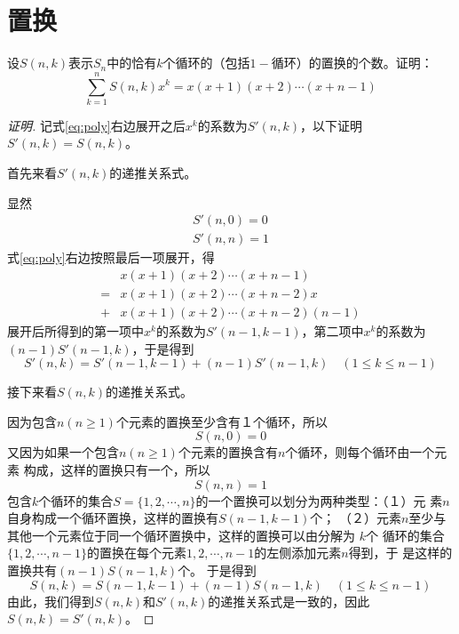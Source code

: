 \chapter{置换}
\begin{Ex}
  设$S(n,k)$表示$S_n$中的恰有$k$个循环的（包括$1-$循环）的置换的个数。证明：
  \begin{equation}
    \label{eq:poly}
    \sum_{k=1}^nS(n,k)x^k = x(x+1)(x+2)\cdots(x+n-1)
  \end{equation}
\end{Ex}
\begin{proof}[证明]
  记式\eqref{eq:poly}右边展开之后$x^k$的系数为$S'(n,k)$，以下证明
  $S'(n,k)=S(n,k)$。

  首先来看$S'(n,k)$的递推关系式。
  
  显然
  \begin{equation}
    \begin{split}
      S'(n,0) = 0\\
      S'(n,n) = 1
    \end{split}
  \end{equation}
  式\eqref{eq:poly}右边按照最后一项展开，得
  \begin{equation}
    \begin{split}
    &x(x+1)(x+2)\cdots(x+n-1)\\
    =&x(x+1)(x+2)\cdots(x+n-2)x\\
    +&x(x+1)(x+2)\cdots(x+n-2)(n-1)
    \end{split}
  \end{equation}
  展开后所得到的第一项中$x^k$的系数为$S'(n-1,k-1)$，第二项中$x^k$的系数为
  $(n-1)S'(n-1,k)$，于是得到
  \begin{equation}
    S'(n,k) = S'(n-1,k-1) + (n-1)S'(n-1,k) \quad (1 \leq k \leq n-1)
  \end{equation}

  接下来看$S(n,k)$的递推关系式。
  
  因为包含$n(n\geq 1)$个元素的置换至少含有１个循环，所以
  \begin{equation}
    S(n,0)=0
  \end{equation}
  又因为如果一个包含$n(n\geq 1)$个元素的置换含有$n$个循环，则每个循环由一个元素
  构成，这样的置换只有一个，所以
  \begin{equation}
    S(n,n)=1
  \end{equation}
  包含$k$个循环的集合$S=\{1,2,\cdots,n\}$的一个置换可以划分为两种类型：（１）元
  素$n$自身构成一个循环置换，这样的置换有$S(n-1,k-1)$个；
  （２）元素$n$至少与其他一个元素位于同一个循环置换中，这样的置换可以由分解为
  $k$个
  循环的集合
  $\{1,2,\cdots, n-1\}$的置换在每个元素$1,2,\cdots,n-1$的左侧添加元素$n$得到，于
  是这样的置换共有$(n-1)S(n-1,k)$个。
  于是得到
\begin{equation}
    S(n,k) = S(n-1,k-1) + (n-1)S(n-1,k) \quad (1 \leq k \leq n-1)
  \end{equation}
由此，我们得到$S(n,k)$和$S'(n,k)$的递推关系式是一致的，因此$S(n,k)=S'(n,k)$。  
\end{proof}
